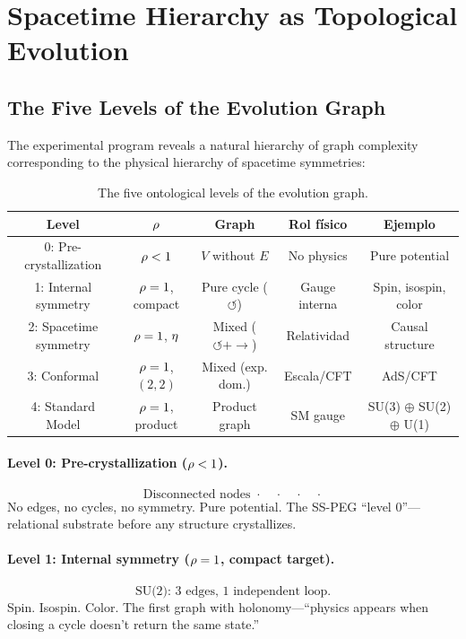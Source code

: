 \section{Spacetime Hierarchy as Topological Evolution}\label{sec:spacetime_hierarchy}

\subsection{The Five Levels of the Evolution Graph}\label{sec:five_levels}

The experimental program reveals a natural hierarchy of graph complexity corresponding to the physical hierarchy of spacetime symmetries:

\begin{table}[h]
\centering
\begin{tabular}{c c c c c}
\hline\hline
Level & $\rho$ & Graph & Rol físico & Ejemplo \\
\hline
0: Pre-crystallization & $\rho < 1$ & $V$ without $E$ & No physics & Pure potential \\
1: Internal symmetry & $\rho = 1$, compact & Pure cycle ($\circlearrowleft$) & Gauge interna & Spin, isospin, color \\
2: Spacetime symmetry & $\rho = 1$, $\eta$ & Mixed ($\circlearrowleft + \to$) & Relatividad & Causal structure \\
3: Conformal & $\rho = 1$, $(2,2)$ & Mixed (exp. dom.) & Escala/CFT & AdS/CFT \\
4: Standard Model & $\rho = 1$, product & Product graph & SM gauge & SU(3) $\oplus$ SU(2) $\oplus$ U(1) \\
\hline\hline
\end{tabular}
\caption{The five ontological levels of the evolution graph.}
\end{table}

\paragraph{Level 0: Pre-crystallization ($\rho < 1$).}
\begin{equation}
\text{Disconnected nodes } \cdot \quad \cdot \quad \cdot \quad \cdot
\end{equation}
No edges, no cycles, no symmetry. Pure potential. The SS-PEG ``level 0''---relational substrate before any structure crystallizes.

\paragraph{Level 1: Internal symmetry ($\rho = 1$, compact target).}
\begin{equation}
\text{SU(2): } 3 \text{ edges, } 1 \text{ independent loop.}
\end{equation}
Spin. Isospin. Color. The first graph with holonomy---``physics appears when closing a cycle doesn't return the same state.''

